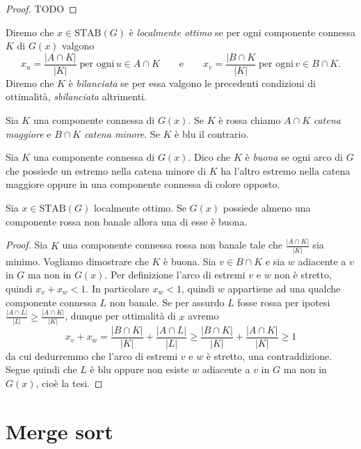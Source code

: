 \begin{proof}
  TODO
\end{proof}

\begin{definition}
  Diremo che \(x\in\text{STAB}(G)\) è \emph{localmente ottimo} se per ogni componente connessa \(K\) di \(G(x)\) valgono
  \[x_u=\frac{|A\cap K|}{|K|}\;\text{per ogni}\,u\in A\cap K\qquad\text{e}\qquad x_v=\frac{|B\cap K}{|K|}\;\text{per ogni}\,v\in B\cap K.\]
  Diremo che \(K\) è \emph{bilanciata} se per essa valgono le precedenti condizioni di ottimalità, \emph{sbilanciata} altrimenti.
\end{definition}

\begin{definition}
	Sia \(K\) una componente connessa di \(G(x)\). Se \(K\) è rossa chiamo \(A\cap K\) \emph{catena maggiore} e \(B\cap K\) \emph{catena minore}. Se \(K\) è blu il contrario. 
\end{definition}
\begin{definition}
	Sia \(K\) una componente connessa di \(G(x)\). Dico che \(K\) è \emph{buona} se ogni arco di \(G\) che possiede un estremo nella catena minore di \(K\) ha l'altro estremo nella catena maggiore oppure in una componente connessa di colore opposto. 
\end{definition}
\begin{lemma}
	Sia \(x\in \text{STAB}(G)\) localmente ottimo. Se \(G(x)\) possiede almeno una componente rossa non banale allora una di esse è buona. 
\end{lemma}
\begin{proof}
	Sia \(K\) una componente connessa rossa non banale tale che \(\frac{|A\cap K|}{|K|}\) sia minimo. Vogliamo dimostrare che \(K\) è buona. Sia \(v\in B\cap K\) e sia \(w\) adiacente a \(v\) in \(G\) ma non in \(G(x)\). Per definizione l'arco di estremi \(v\) e \(w\) non è stretto, quindi \(x_v+x_w<1\). In particolare \(x_w<1\), quindi \(w\) appartiene ad una qualche componente connessa \(L\) non banale. Se per assurdo \(L\) fosse rossa per ipotesi \(\frac{|A\cap L|}{|L|}\ge\frac{|A\cap K|}{|K|}\), dunque per ottimalità di \(x\) avremo
	\[x_v+x_w=\frac{|B\cap K|}{|K|}+\frac{|A\cap L|}{|L|}\ge\frac{|B\cap K|}{|K|}+\frac{|A\cap K|}{|K|}\ge 1\]
	da cui dedurremmo che l'arco di estremi \(v\) e \(w\) è stretto, una contraddizione. Segue quindi che \(L\) è blu oppure non esiste \(w\) adiacente a \(v\) in \(G\) ma non in \(G(x)\), cioè la tesi. 
\end{proof}

\section{Merge sort} 
